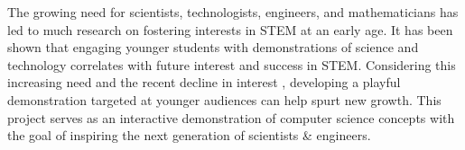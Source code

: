 The growing need for scientists, technologists, engineers, and mathematicians has led to much research on fostering interests in STEM at an early age. It has been shown \cite{McClure2017} that engaging younger students with demonstrations of science and technology correlates with future interest and success in STEM. Considering this increasing need and the recent decline in interest \cite{Sadler2012}, developing a playful demonstration targeted at younger audiences can help spurt new growth. This project serves as an interactive demonstration of computer science concepts with the goal of inspiring the next generation of scientists \& engineers.

